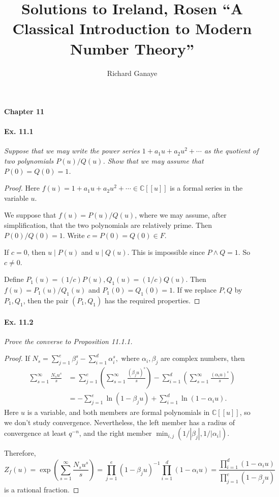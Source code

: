 \documentclass[11pt,a4paper]{article}
\title{Solutions to Ireland, Rosen ``A Classical Introduction to Modern Number Theory''}
\author{Richard Ganaye}
\newcommand{\C}{\mathbb{C}}
\begin{document}
{ \Large \bf Chapter 11} 

\paragraph{Ex. 11.1}{\it  Suppose that we may write the power series $1+a_1u +a_2u^2+\cdots$ as the quotient of two polynomials $P(u)/Q(u)$. Show that we may assume that $P(0) = Q(0) = 1$.
}

\begin{proof}
Here $f(u) = 1+a_1u +a_2u^2+\cdots \in \C[[u]]$ is a formal series in the variable $u$.

We suppose that $f(u) = P(u)/Q(u)$, where we may assume, after simplification, that the two polynomials are relatively prime. Then $P(0)/Q(0) =1$. Write $c = P(0) = Q(0) \in F$.

If $c = 0$, then $u\mid P(u)$ and $u \mid Q(u)$. This is impossible since $P \wedge Q = 1$. So $c \ne 0$.

Define $P_1(u) = (1/c) P(u), Q_1(u) = (1/c) Q(u)$. Then $f(u) = P_1(u)/Q_1(u)$ and $P_1(0) = Q_1(0) = 1$. If we replace $P,Q$ by $P_1,Q_1$, then the pair $(P_1,Q_1)$ has the required properties.
\end{proof}

\paragraph{Ex. 11.2}{\it Prove the converse to Proposition 11.1.1.
}

\begin{proof}
If $N_s = \sum_{j=1}^e \beta_j^s - \sum_{i=1}^d \alpha_i^s,$ where $\alpha_i,\beta_j$ are complex numbers,  then
\begin{align*}
\sum_{s=1}^\infty \frac{N_s u^s}{s} &=  \sum_{j=1}^e \left( \sum_{s=1}^\infty \frac{(\beta_j u)^s}{s} \right) - \sum_{i=1}^d \left( \sum_{s=1}^\infty \frac{(\alpha_i u)^s}{s} \right)\\
&=-\sum_{j=1}^e \ln(1 - \beta_ju) + \sum_{i=1}^d \ln(1 - \alpha_i u).
\end{align*}
Here $u$ is a variable, and both members are formal polynomials in $\C[[u]]$, so we don't study convergence. Nevertheless, the left member has a radius of convergence at least $q^{-n}$, and the right member $\min_{i,j}(1/|\beta_j|,1/|\alpha_i|)$.

Therefore,
$$Z_f(u) = \exp\left(\sum_{s=1}^\infty \frac{N_s u^s}{s} \right) = \prod_{j=1}^e(1 - \beta_j u)^{-1} \prod_{i=1}^d (1-\alpha_i u) = \frac{\prod_{i=1}^d (1 - \alpha_i u)}{\prod_{j=1}^e (1 - \beta_j u)}$$
is a rational fraction.
\end{proof}
\end{document}
